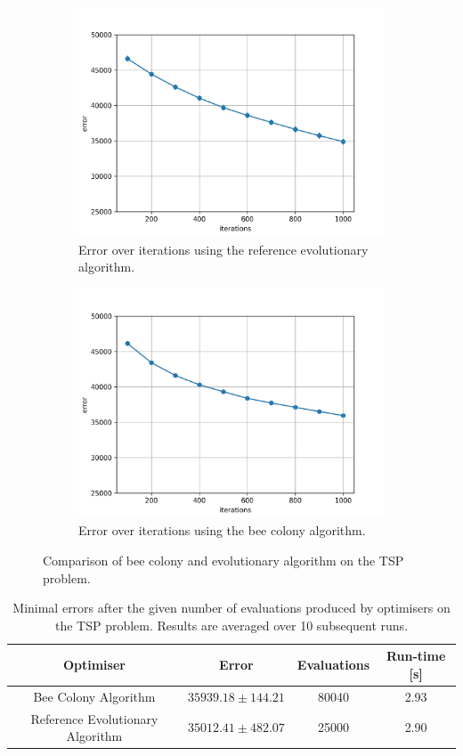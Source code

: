 \begin{figure}[h]
	\centering
	\begin{subfigure}{.5\textwidth}
		\centering
		\captionsetup{width=0.75\linewidth}
		\includegraphics[width=0.75\linewidth]{assets/reference_tsp.png}
		\caption{Error over iterations using the reference evolutionary algorithm.}
		\label{fig:reference_tsp}
	\end{subfigure}%
	\begin{subfigure}{.5\textwidth}
		\centering
    \captionsetup{width=0.75\linewidth}
		\includegraphics[width=0.75\linewidth]{assets/beecolony_tsp.png}
		\caption{Error over iterations using the bee colony algorithm.}
		\label{fig:becolony_tsp}
	\end{subfigure}
	\caption{Comparison of bee colony and evolutionary algorithm on the TSP problem.}
	\label{fig:bee_vs_ea}
\end{figure}

\begin{table}[H]
	\centering
	\begin{tabular}{|c c c c|}
		\hline
		\textbf{Optimiser} & \textbf{Error} & \textbf{Evaluations} & \textbf{Run-time [s]} \\
		\hline
		Bee Colony Algorithm & $35939.18 \pm 144.21$ & 80040 & 2.93 \\
		Reference Evolutionary Algorithm & $35012.41 \pm 482.07$ & 25000 & 2.90 \\
		\hline
	\end{tabular}
	\caption{Minimal errors after the given number of evaluations produced by optimisers on the TSP problem. Results are averaged over 10 subsequent runs.}
	\label{tab:bee_vs_ea}
\end{table}
